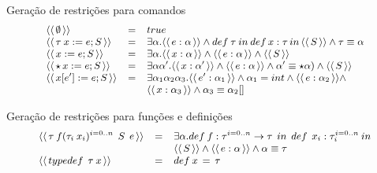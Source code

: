 \documentclass{beamer}
\newcommand{\constr}[1]{\ensuremath{\langle\langle\,#1\,\rangle\rangle}}
\begin{document}
   \begin{frame}{Geração de restrições para comandos}
       \[
          \small{
           \begin{array}{lcl}
               \constr{\emptyset} & = & true \\
               \constr{\tau\:x := e; S} & = & \exists \alpha. \constr{e : \alpha} \land
                                              def\:\tau\: in\:
                                              def\,x:\tau\,in\,\constr{S}
             \land \tau \equiv \alpha\\
               \constr{x := e ; S} & = & \exists \alpha. \constr{x : \alpha}\land\constr{e : \alpha} \land
                                                      \constr{S}\\ 
               \constr{\star\,x := e ; S} & = & \exists \alpha \alpha'. \constr{x : \alpha'}\land\constr{e : \alpha} \land
                                                      \alpha' \equiv
                                                \star \alpha)\land\constr{S}\\ 
               \constr{x[e'] := e ; S} & = &
                                             \exists\alpha_1\alpha_2\alpha_3.\constr{e'
                                             : \alpha_1}\land \alpha_1
                                             = int \land \constr{e :
                                             \alpha_2} \land \\ 
                       & & \constr{x : \alpha_3} \land
                           \alpha_3 \equiv \alpha_2[] \\
           \end{array}}
       \]
   \end{frame}
   \begin{frame}{Geração de restrições para funções e definições}
       \[
           \small{
                \begin{array}{lcl}
              \constr{\tau\:f(\tau_i\:x_i)^{i=0..n}\:\:S\:\:e} & = &
                                                                     \exists
                                                                     \alpha. def\:f:\tau^{i=0..n}\to\tau\:\:in\:\:def\:\:x_i:\tau_i^{i=0..n}\:in\\
                      & &\constr{S}\land\constr{e : \alpha} \land
                          \alpha \equiv \tau\\
              \constr{typedef\:\:\tau\: x} & = & def\:x\,=\,\tau\\
                \end{array}
           }
       \]
   \end{frame}
\end{document}
